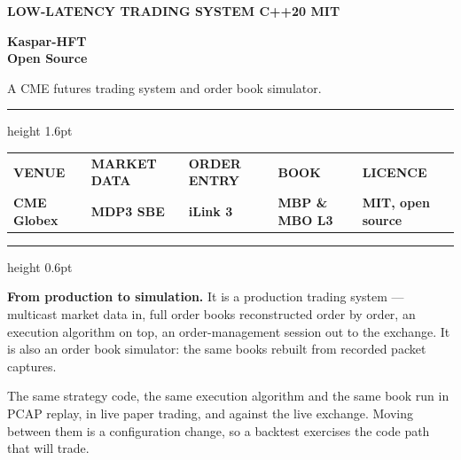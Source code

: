 \documentclass[10pt]{article}
\begin{document}
{\color{accent}\sffamily\bfseries\scriptsize
 LOW-LATENCY TRADING SYSTEM \quad\textperiodcentered\quad C++20 \quad\textperiodcentered\quad MIT}

\vspace{2pt}
{\sffamily\bfseries\fontsize{40}{40}\selectfont Kaspar-HFT}\\[2pt]
{\color{ink2}\sffamily\bfseries\fontsize{19}{19}\selectfont Open Source}

\vspace{4pt}
{\color{ink2}\sffamily\large A CME futures trading system and order book simulator.}

\vspace{7pt}
{\color{ink}\hrule height 1.6pt}
\vspace{5pt}

\noindent\begin{tabularx}{\textwidth}{@{}XXXXX@{}}
{\color{ink3}\sffamily\bfseries\scriptsize VENUE} &
{\color{ink3}\sffamily\bfseries\scriptsize MARKET DATA} &
{\color{ink3}\sffamily\bfseries\scriptsize ORDER ENTRY} &
{\color{ink3}\sffamily\bfseries\scriptsize BOOK} &
{\color{ink3}\sffamily\bfseries\scriptsize LICENCE} \\[-4pt]
\sffamily\bfseries\small CME Globex &
\sffamily\bfseries\small MDP3 SBE &
\sffamily\bfseries\small iLink 3 &
\sffamily\bfseries\small MBP \& MBO L3 &
\sffamily\bfseries\small MIT, open source \\
\end{tabularx}

\vspace{2pt}
{\color{rulec}\hrule height 0.6pt}

\vspace{8pt}
\textbf{From production to simulation.} It is a production trading
system --- multicast market data in, full order books reconstructed order by
order, an execution algorithm on top, an order-management session out to
the exchange. It is also an order book simulator: the same books rebuilt from recorded
packet captures.

The same strategy code, the same execution algorithm
and the same book run in PCAP replay, in live paper trading, and against the live
exchange. Moving between them is a configuration change, so a backtest
exercises the code path that will trade.

\end{document}
